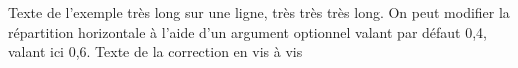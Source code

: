\begin{exemple*1}
  \phantom{rrr}
  
  \correction
\end{exemple*1}

\begin{exemple}[0.6]
  Texte de l’exemple très long sur une ligne, très très très long.
  On peut modifier la répartition horizontale  à l'aide d'un argument optionnel valant par défaut 0,4, valant ici 0,6.
  \correction
  Texte de la correction en vis à vis
\end{exemple}